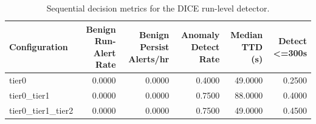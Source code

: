 \begin{table}[t]
\centering
\caption{Sequential decision metrics for the DICE run-level detector.}
\label{tab:dice_sequential_metrics}
\footnotesize
\begin{tabular}{lrrrrr}
\toprule
Configuration & Benign Run-Alert Rate & Benign Persist Alerts/hr & Anomaly Detect Rate & Median TTD (s) & Detect <=300s \\
\midrule
tier0 & 0.0000 & 0.0000 & 0.4000 & 49.0000 & 0.2500 \\
tier0_tier1 & 0.0000 & 0.0000 & 0.7500 & 88.0000 & 0.4000 \\
tier0_tier1_tier2 & 0.0000 & 0.0000 & 0.7500 & 49.0000 & 0.4500 \\
\bottomrule
\end{tabular}

\end{table}
